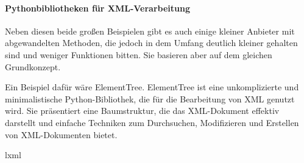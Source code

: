 \paragraph{Pythonbibliotheken für XML-Verarbeitung}
Neben diesen beide großen Beispielen gibt es auch einige kleiner Anbieter mit abgewandelten Methoden,
die jedoch in dem Umfang deutlich kleiner gehalten sind und weniger Funktionen bitten.
Sie basieren aber auf dem gleichen Grundkonzept.

Ein Beispiel dafür wäre ElementTree.
ElementTree ist eine unkomplizierte und minimalistische Python-Bibliothek, die für die Bearbeitung von \ac{XML} genutzt wird.
Sie präsentiert eine Baumstruktur, die das \ac{XML}-Dokument effektiv darstellt und einfache Techniken zum Durchsuchen,
Modifizieren und Erstellen von \ac{XML}-Dokumenten bietet.\cite*{ElementTree2025}

lxml
\pagebreak